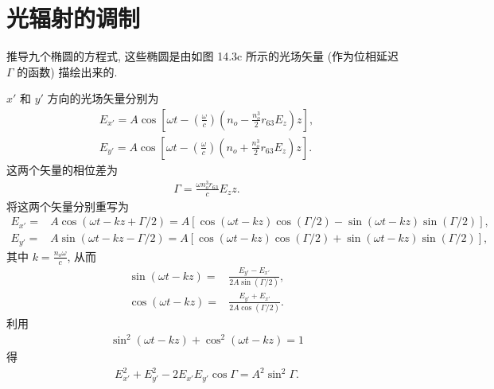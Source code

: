 \documentclass{note}
\begin{document}
\fi
\setcounter{chapter}{13}
\chapter{光辐射的调制}
\begin{exe}
    推导九个椭圆的方程式, 这些椭圆是由如图 14.3c 所示的光场矢量 (作为位相延迟 $\Gamma$ 的函数) 描绘出来的.
\end{exe}
\begin{pf}
    $x'$ 和 $y'$ 方向的光场矢量分别为
    \begin{align}
        \label{14.1-1}
        E_{x'}=A\cos\left[\omega t-\left(\frac{\omega}{c}\right)\left(n_o-\frac{n_o^3}{2}r_{63}E_z\right)z\right],\\
        \label{14.1-2}
        E_{y'}=A\cos\left[\omega t-\left(\frac{\omega}{c}\right)\left(n_o+\frac{n_o^3}{2}r_{63}E_z\right)z\right].
    \end{align}
    这两个矢量的相位差为
    \begin{align}
        \Gamma=\frac{\omega n_o^3r_{63}}{c}E_zz.
    \end{align}
    将这两个矢量分别重写为
    \begin{align}
        E_{x'}=&A\cos(\omega t-kz+\Gamma/2)=A[\cos(\omega t-kz)\cos(\Gamma/2)-\sin(\omega t-kz)\sin(\Gamma/2)],\\
        E_{y'}=&A\sin(\omega t-kz-\Gamma/2)=A[\cos(\omega t-kz)\cos(\Gamma/2)+\sin(\omega t-kz)\sin(\Gamma/2)],
    \end{align}
    其中 $k=\frac{n_o\omega}{c}$,
    从而
    \begin{align}
        \sin(\omega t-kz)=&\frac{E_{y'}-E_{x'}}{2A\sin(\Gamma/2)},\\
        \cos(\omega t-kz)=&\frac{E_{y'}+E_{x'}}{2A\cos(\Gamma/2)}.
    \end{align}
    利用
    \begin{align}
        \sin^2(\omega t-kz)+\cos^2(\omega t-kz)=1
    \end{align}
    得
    \begin{align}
        E_{x'}^2+E_{y'}^2-2E_{x'}E_{y'}\cos\Gamma=A^2\sin^2\Gamma.
    \end{align}
\end{pf}
\end{document}
